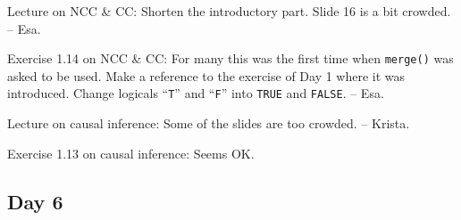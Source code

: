 \documentclass[11pt,a4]{article}
\begin{document}
Lecture on NCC \& CC: Shorten the introductory part. Slide 16 is a bit crowded. -- Esa. 

Exercise 1.14 on NCC \& CC: 
For many this was the first time when {\tt merge()} was asked to be used. 
Make a reference to the exercise of Day 1 where it was introduced.
Change logicals ``{\tt T}'' and ``{\tt F}'' into
{\tt TRUE} and {\tt FALSE}. -- Esa.

Lecture on causal inference: Some of the slides are too crowded. -- Krista.

Exercise 1.13 on causal inference: Seems OK.

\subsection*{Day 6}
\end{document}
